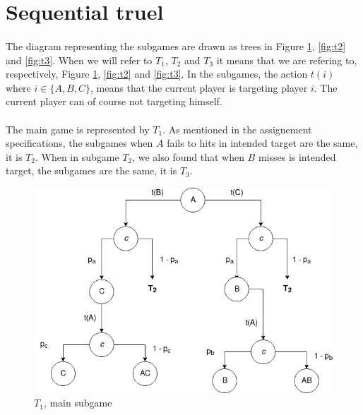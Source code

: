 \documentclass[letterpaper]{article}
\begin{document}
\section{Sequential truel}

\paragraph{}

The diagram representing the subgames are drawn as trees in
Figure \ref{fig:t1}, \ref{fig:t2} and \ref{fig:t3}. When we will refer to $T_1$,
$T_2$ and $T_3$ it means that we are refering to, respectively,
Figure \ref{fig:t1}, \ref{fig:t2} and \ref{fig:t3}. In the subgames,
the action $t(i)$ where $i \in \{A, B, C\}$, means that the current player
is targeting player $i$. The current player can of course not targeting himself.

\paragraph{}

The main game is represented by
$T_1$. As mentioned in the
assignement specifications, the subgames when $A$ fails to hits in intended
target are the same,  it is $T_2$. When in subgame $T_2$, we also found
that when $B$ misses is intended target, the subgames are the same, it is $T_3$.

\begin{figure}[!ht]
 \centerline{\includegraphics[scale=0.5]{images/T1}}
 \caption{$T_1$, main subgame}
 \label{fig:t1}
\end{figure}
\end{document}
